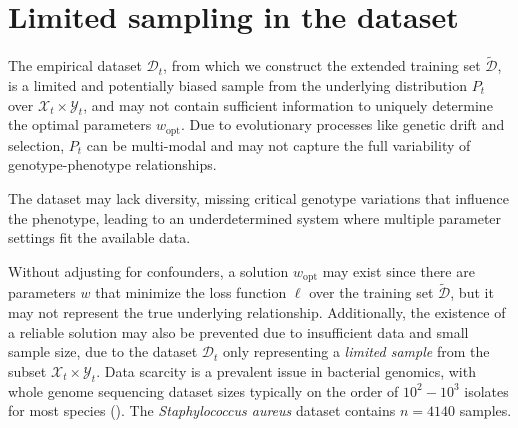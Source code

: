 \documentclass[12pt]{article}
\begin{document}



\section{Limited sampling in the dataset}

The empirical dataset $\mathcal{D}_t$, from which we construct the extended training set $\tilde{\mathcal{D}}$, is a limited and potentially biased sample from the underlying distribution $P_t$ over $\mathcal{X}_t \times \mathcal{Y}_t$, and may not contain sufficient information to uniquely determine the optimal parameters $w_{\text{opt}}$. Due to evolutionary processes like genetic drift and selection, $P_t$ can be multi-modal and may not capture the full variability of genotype-phenotype relationships. 

The dataset may lack diversity, missing critical genotype variations that influence the phenotype, leading to an underdetermined system where multiple parameter settings fit the available data. 

Without adjusting for confounders, a solution $w_{\text{opt}}$ may exist since there are parameters $w$ that minimize the loss function $\ell$ over the training set $\tilde{ \mathcal{D}}$, but it may not represent the true underlying relationship. Additionally, the existence of a reliable solution may also be prevented due to insufficient data and small sample size, due to the dataset $\mathcal{D}_t$ only representing a \textit{limited sample} from the subset $\mathcal{X}_t \times \mathcal{Y}_t$. Data scarcity is a prevalent issue in bacterial genomics, with whole genome sequencing dataset sizes typically on the order of $10^2 - 10^3$ isolates for most species (\cite{mosquera2023genome}). The \textit{Staphylococcus aureus} dataset contains $n=4140$ samples.




\end{document}

